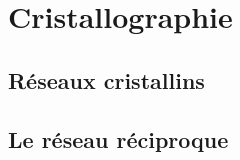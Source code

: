\setcounter{chapter}{2}
\chapter{Cristallographie}
\section{Réseaux cristallins}
\section{Le réseau réciproque}